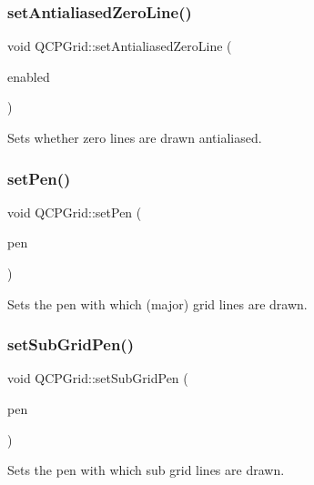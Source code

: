 \subsubsection{\texorpdfstring{set\+Antialiased\+Zero\+Line()}{setAntialiasedZeroLine()}}
{\footnotesize\ttfamily void Q\+C\+P\+Grid\+::set\+Antialiased\+Zero\+Line (\begin{DoxyParamCaption}\item[{bool}]{enabled }\end{DoxyParamCaption})}

Sets whether zero lines are drawn antialiased. \mbox{\label{class_q_c_p_grid_aa05ab9816ffb440908171e45e833b593}} 
\subsubsection{\texorpdfstring{set\+Pen()}{setPen()}}
{\footnotesize\ttfamily void Q\+C\+P\+Grid\+::set\+Pen (\begin{DoxyParamCaption}\item[{const Q\+Pen \&}]{pen }\end{DoxyParamCaption})}

Sets the pen with which (major) grid lines are drawn. \mbox{\label{class_q_c_p_grid_a9edd3593f384d1f0b0202a39cef4453d}} 
\subsubsection{\texorpdfstring{set\+Sub\+Grid\+Pen()}{setSubGridPen()}}
{\footnotesize\ttfamily void Q\+C\+P\+Grid\+::set\+Sub\+Grid\+Pen (\begin{DoxyParamCaption}\item[{const Q\+Pen \&}]{pen }\end{DoxyParamCaption})}

Sets the pen with which sub grid lines are drawn. \mbox{\label{class_q_c_p_grid_ad4ad6bf714ec45e08845456355a1b700}} 
